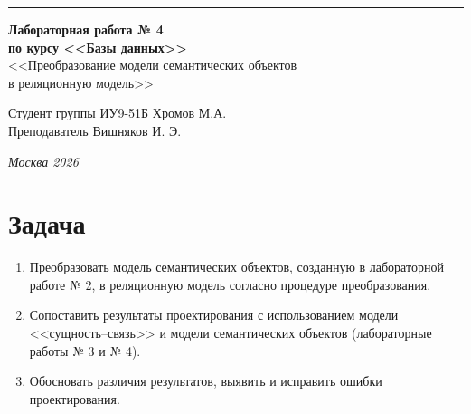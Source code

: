 \documentclass[a4paper, 14pt]{extarticle}
\begin{document}
\begin{titlepage}
\vspace*{-16pt}
\hspace{30pt}\rule{0.866\textwidth}{0.4pt}

\vspace{11em}

\begin{center}
\Large {\bf Лабораторная работа № 4} \\

\large {\bf по курсу <<Базы данных>>} \\[0.8cm]

\large <<Преобразование модели семантических объектов\\
в реляционную модель>>
\end{center}
\normalsize

\vspace{8em}


\begin{flushright}
  {Студент группы ИУ9-51Б Хромов М.А. \hspace*{15pt}\\
  \vspace{2ex}
  Преподаватель Вишняков И. Э.\hspace*{15pt}}
\end{flushright}

\bigskip

\vfill


\begin{center}
\textsl{Москва 2026}
\end{center}
\end{titlepage}



\setcounter{page}{2}

\section{Задача}
\begin{enumerate}
  \item Преобразовать модель семантических объектов, созданную в лабораторной работе № 2, в реляционную модель согласно процедуре преобразования.
  \item Сопоставить результаты проектирования с использованием модели <<сущность--связь>> и модели семантических объектов (лабораторные работы № 3 и № 4).
  \item Обосновать различия результатов, выявить и исправить ошибки проектирования.
\end{enumerate}
\end{document}
